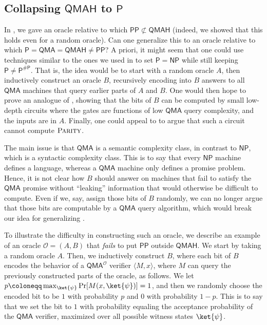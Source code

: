 \documentclass[11pt]{article}%
\newcommand{\PARITY}{\normalfont\textsc{Parity}}
\begin{document}
\subsection{Collapsing \texorpdfstring{$\mathsf{QMAH}$}{QMAH} to \texorpdfstring{$\mathsf{P}$}{P}}
In , we gave an oracle relative to which $\mathsf{PP} \not\subset \mathsf{QMAH}$ (indeed, we showed that this holds even for a random oracle). Can one generalize this to an oracle relative to which $\mathsf{P}=\mathsf{QMA}=\mathsf{QMAH}\neq\mathsf{PP}$? A priori, it might seem that one could use techniques similar to the ones we used in  to set $\mathsf{P} = \mathsf{NP}$ while still keeping $\mathsf{P} \neq \mathsf{P^{\# P}}$. That is, the idea would be to start with a random oracle $A$, then inductively construct an oracle $B$, recursively encoding into $B$ answers to all $\mathsf{QMA}$ machines that query earlier parts of $A$ and $B$. One would then hope to prove an analogue of , showing that the bits of $B$ can be computed by small low-depth circuits where the gates are functions of low $\mathsf{QMA}$ query complexity, and the inputs are in $A$. Finally, one could appeal to  to argue that such a circuit cannot compute $\PARITY$.

The main issue is that $\mathsf{QMA}$ is a semantic complexity class, in contrast to $\mathsf{NP}$, which is a syntactic complexity class. This is to say that every $\mathsf{NP}$ machine defines a language, whereas a $\mathsf{QMA}$ machine only defines a promise problem. Hence, it is not clear how $B$ should answer on machines that fail to satisfy the $\mathsf{QMA}$ promise without ``leaking'' information that would otherwise be difficult to compute. Even if we, say, assign those bits of $B$ randomly, we can no longer argue that those bits are computable by a $\mathsf{QMA}$ query algorithm, which would break our idea for generalizing .

To illustrate the difficulty in constructing such an oracle, we describe an example of an oracle $\mathcal{O} = (A, B)$ that \textit{fails} to put $\mathsf{PP}$ outside $\mathsf{QMAH}$. We start by taking a random oracle $A$. Then, we inductively construct $B$, where each bit of $B$ encodes the behavior of a $\mathsf{QMA}^\mathcal{O}$ verifier $\langle M, x \rangle$, where $M$ can query the previously constructed parts of the oracle, as follows. We let $p \coloneqq \max_{\ket{\psi}} \Pr[M(x, \ket{\psi})] = 1$, and then we randomly choose the encoded bit to be $1$ with probability $p$ and $0$ with probability $1-p$. This is to say that we set the bit to $1$ with probability equaling the acceptance probability of the $\mathsf{QMA}$ verifier, maximized over all possible witness states $\ket{\psi}$.
\end{document}
